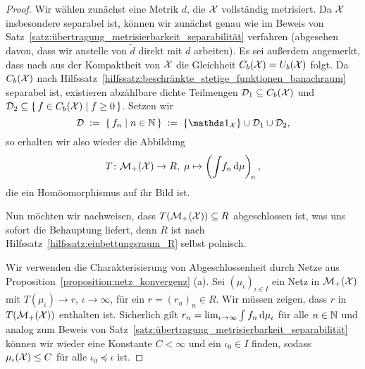 \documentclass[../thesis/thesis.tex]{subfiles}
\begin{document}
	\begin{proof}
		Wir wählen zunächst eine Metrik $d$, die $\mathcal{X}$ vollständig metrisiert. Da $\mathcal{X}$ insbesondere separabel ist, können wir zunächst genau wie 
		im Beweis von Satz~\ref{satz:übertragung_metrisierbarkeit_separabilität} verfahren
		(abgesehen davon, dass wir anstelle von $\tilde{d}$ direkt mit $d$ arbeiten). Es sei außerdem angemerkt, dass nach \cite[Theorem 2.4.1]{Simon.2015} aus der Kompaktheit von $\mathcal{X}$ die Gleichheit $C_b(\mathcal{X}) = U_b(\mathcal{X})$ folgt. Da $C_b(\mathcal{X})$ nach Hilfssatz~\ref{hilfssatz:beschränkte_stetige_funktionen_banachraum} separabel ist, existieren abzählbare dichte Teilmengen $\mathcal{D}_1 \subseteq C_b(\mathcal{X})$ und $\mathcal{D}_2 \subseteq \left\{\, f \in C_b(\mathcal{X}) \; \middle| \; f \geq 0 \,\right\}$. Setzen wir 
		\[ \mathcal{D} \; \defby \; \setcomp{f_n}{n \in \N} \; \defby \; \set{\indfct_\X} \cup \mathcal{D}_1 \cup \mathcal{D}_2 \text{,} \] 
		so erhalten wir also wieder die Abbildung
		\[ T \colon \mathcal{M}_{+}(\mathcal{X}) \to R, \; \mu \mapsto \left( \int_{} \, f_n \, \mathrm{d}\mu \right)_{\! n}  \text{,} \]
		die ein Homöomorphismus auf ihr Bild ist. 
		
		Nun möchten wir nachweisen, dass $T(\mathcal{M}_{+}(\mathcal{X})) \subseteq R$ abgeschlossen ist, was uns sofort die Behauptung liefert, denn $R$ ist nach Hilfssatz~\ref{hilfssatz:einbettungsraum_R} selbst polnisch.
		
		Wir verwenden die Charakterisierung von Abgeschlossenheit 
		durch Netze aus Proposition~\ref{proposition:netz_konvergenz} (a). Sei $(\mu_\iota)_{\iota \in I}$ ein Netz in $\mathcal{M}_{+}(\mathcal{X})$ mit $T(\mu_\iota) \to r$, $\iota \to \infty$,
		für ein $r = (r_n)_n \in R$. Wir müssen zeigen, dass $r$ in $T(\mathcal{M}_{+}(\mathcal{X}))$ enthalten ist. Sicherlich gilt
		$r_n = \lim_{\iota \to \infty} \int_{} \, f_n \, \mathrm{d}\mu_\iota$ für alle $n \in \mathbb{N}$ und analog zum Beweis von Satz~\ref{satz:übertragung_metrisierbarkeit_separabilität} 
		können wir wieder eine Konstante $C < \infty$ und ein $\iota_0 \in I$ finden, sodass $\mu_\iota(\mathcal{X}) \leq C$ für alle $\iota_0 \preceq \iota$ ist.
		

\end{proof}
\end{document}
